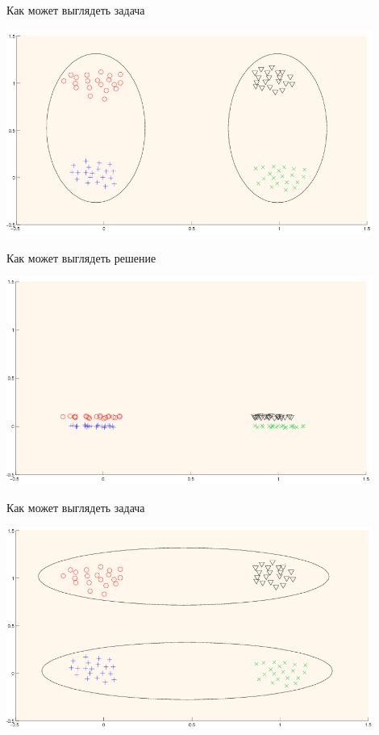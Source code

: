 \documentclass[14pt, fleqn, xcolor={dvipsnames, table}]{beamer}
\begin{document}
\begin{frame}{Как может выглядеть задача}
\begin{center}
\includegraphics[width=0.9\textwidth]{linsep-setup2.png}
\end{center}
\end{frame}

\begin{frame}{Как может выглядеть решение}
\begin{center}
\includegraphics[width=0.9\textwidth]{linsep-solution.png}
\end{center}
\end{frame}

\begin{frame}{Как может выглядеть задача}
\begin{center}
\includegraphics[width=0.9\textwidth]{linsep-setup3.png}
\end{center}
\end{frame}
\end{document}
